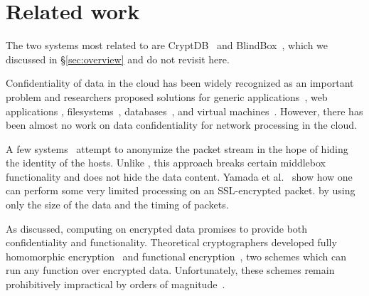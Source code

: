 
\section{Related work}\label{sec:related}
The two systems most related to \sys are CryptDB~\cite{popa:cryptdb} and BlindBox~\cite{blindbox}, which we discussed in \S\ref{sec:overview} and do not revisit here.


Confidentiality of data in the cloud has been widely recognized as an important problem and researchers proposed solutions for generic applications~\cite{Baumann:Haven}, web applications \cite{giffin:hails, Mylar},  filesystems~\cite{blaze:cfs, kallahalla:plutus, goh:sirius},  databases~\cite{popa:cryptdb},  and virtual machines~\cite{Zhang:CloudVisor}. However, there has been almost no work on data confidentiality for network processing in the cloud. 

A few systems~\cite{Vern:Anonymize03, Vern:Anonymize06} attempt to anonymize the packet stream in the hope of hiding the identity of the hosts.
Unlike \sys, this approach breaks certain middlebox functionality and does not hide the data content.
Yamada et al.~\cite{Yamada_IDS} show how one can perform some very limited processing on an 
SSL-encrypted packet.
     by using only the size of the data and the timing of packets. %


As discussed, computing on encrypted data promises to provide both confidentiality and functionality. Theoretical cryptographers developed fully homomorphic encryption~\cite{gentry:fhe, gentry:fhe-aes-eprint} and functional encryption~\cite{BSW11}, two schemes which can run any function over encrypted data. Unfortunately, these schemes remain prohibitively impractical by orders of magnitude~\cite{gentry:fhe-aes-eprint}.


